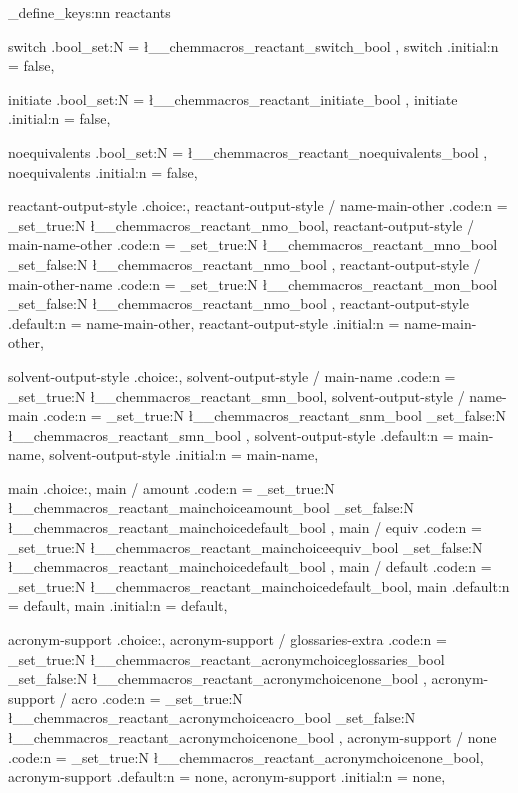 \chemmacros_define_keys:nn {reactants}
  {
    switch .bool_set:N = \l__chemmacros_reactant_switch_bool ,
    switch .initial:n  = false,
    
    initiate .bool_set:N = \l__chemmacros_reactant_initiate_bool ,
    initiate .initial:n  = false,
    
    noequivalents .bool_set:N = \l__chemmacros_reactant_noequivalents_bool ,
    noequivalents .initial:n  = false,
    
    reactant-output-style .choice:, 
    reactant-output-style / name-main-other .code:n = \bool_set_true:N \l__chemmacros_reactant_nmo_bool,
    reactant-output-style / main-name-other .code:n = 
      {
        \bool_set_true:N \l__chemmacros_reactant_mno_bool
        \bool_set_false:N \l__chemmacros_reactant_nmo_bool
      },
    reactant-output-style / main-other-name .code:n = 
      {
        \bool_set_true:N \l__chemmacros_reactant_mon_bool
        \bool_set_false:N \l__chemmacros_reactant_nmo_bool
      },
    reactant-output-style .default:n  = name-main-other, 
    reactant-output-style .initial:n  = name-main-other, 
    
    solvent-output-style .choice:, 
    solvent-output-style / main-name .code:n = \bool_set_true:N \l__chemmacros_reactant_smn_bool,
    solvent-output-style / name-main .code:n = 
      {
        \bool_set_true:N \l__chemmacros_reactant_snm_bool
        \bool_set_false:N \l__chemmacros_reactant_smn_bool
      },
    solvent-output-style .default:n  = main-name, 
    solvent-output-style .initial:n  = main-name,
    
    main .choice:, 
    main / amount .code:n  = 
      {
        \bool_set_true:N \l__chemmacros_reactant_mainchoiceamount_bool 
        \bool_set_false:N \l__chemmacros_reactant_mainchoicedefault_bool
      },
    main / equiv .code:n   = 
      {
        \bool_set_true:N \l__chemmacros_reactant_mainchoiceequiv_bool
        \bool_set_false:N \l__chemmacros_reactant_mainchoicedefault_bool
      },
    main / default .code:n = \bool_set_true:N \l__chemmacros_reactant_mainchoicedefault_bool,
    main .default:n  = default,
    main .initial:n  = default, 
    
    acronym-support .choice:, 
    acronym-support / glossaries-extra .code:n  = 
      {
        \bool_set_true:N \l__chemmacros_reactant_acronymchoiceglossaries_bool 
        \bool_set_false:N \l__chemmacros_reactant_acronymchoicenone_bool
      },
    acronym-support / acro .code:n   = 
      {
        \bool_set_true:N \l__chemmacros_reactant_acronymchoiceacro_bool
        \bool_set_false:N \l__chemmacros_reactant_acronymchoicenone_bool
      },
    acronym-support / none .code:n = \bool_set_true:N \l__chemmacros_reactant_acronymchoicenone_bool,
    acronym-support .default:n  = none,
    acronym-support .initial:n  = none,    
  }
  
